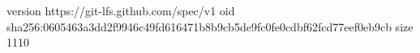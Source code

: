 version https://git-lfs.github.com/spec/v1
oid sha256:0605463a3dd2f9946c49fd616471b8b9cb5de9fc0fe0cdbf62fcd77eef0eb9cb
size 1110
